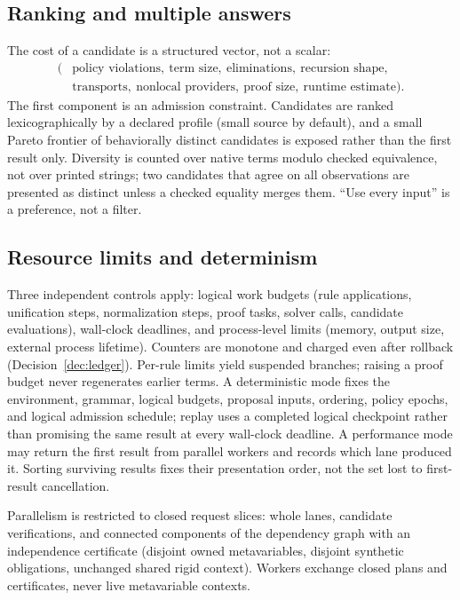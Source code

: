 \subsection{Ranking and multiple answers}\label{sec:ranking}

The cost of a candidate is a structured vector, not a scalar:
\[
\begin{aligned}
(&\text{policy violations},\ \text{term size},\ \text{eliminations},\ \text{recursion shape},\\
 &\text{transports},\ \text{nonlocal providers},\ \text{proof size},\ \text{runtime estimate}).
\end{aligned}
\]
The first component is an admission constraint. Candidates are ranked lexicographically by a declared profile (small source by default), and a small Pareto frontier of behaviorally distinct candidates is exposed rather than the first result only. Diversity is counted over native terms modulo checked equivalence, not over printed strings; two candidates that agree on all observations are presented as distinct unless a checked equality merges them. ``Use every input'' is a preference, not a filter.

\subsection{Resource limits and determinism}

Three independent controls apply: logical work budgets (rule applications, unification steps, normalization steps, proof tasks, solver calls, candidate evaluations), wall-clock deadlines, and process-level limits (memory, output size, external process lifetime). Counters are monotone and charged even after rollback (Decision~\ref{dec:ledger}). Per-rule limits yield suspended branches; raising a proof budget never regenerates earlier terms. A deterministic mode fixes the environment, grammar, logical budgets, proposal inputs, ordering, policy epochs, and logical admission schedule; replay uses a completed logical checkpoint rather than promising the same result at every wall-clock deadline. A performance mode may return the first result from parallel workers and records which lane produced it. Sorting surviving results fixes their presentation order, not the set lost to first-result cancellation.

Parallelism is restricted to closed request slices: whole lanes, candidate verifications, and connected components of the dependency graph with an independence certificate (disjoint owned metavariables, disjoint synthetic obligations, unchanged shared rigid context). Workers exchange closed plans and certificates, never live metavariable contexts.
